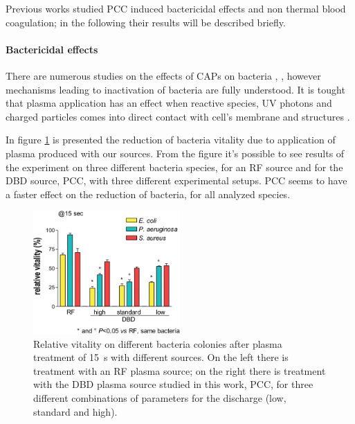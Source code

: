Previous works studied PCC induced bactericidal effects and non thermal blood coagulation; in the following their results will be described briefly.

\paragraph{Bactericidal effects}
There are numerous studies on the effects of CAPs on bacteria \cite{1167632}, \cite{1673530}, however mechanisms leading to inactivation of bacteria are fully understood. It is tought that plasma application has an effect when reactive species, UV photons and charged particles comes into direct contact with cell's membrane and structures \cite{plmed_review}.

In figure \ref{fig:bact} is presented the reduction of bacteria vitality due to application of plasma produced with our sources. From the figure it's possible to see results of the experiment on three different bacteria species, for an RF source and for the DBD source, PCC, with three different experimental setups. PCC seems to have a faster effect on the reduction of bacteria, for all analyzed species. 
\begin{figure}
 \centering
 \includegraphics[width=0.5\textwidth]{Images/Intro/bacteria2.png}
 \caption{Relative vitality on different bacteria colonies after plasma treatment of \SI{15}{\second} with different sources. On the left there is treatment with an RF plasma source; on the right there is treatment with the DBD plasma source studied in this work, PCC, for three different combinations of parameters for the discharge (low, standard and high).}
 \label{fig:bact}
\end{figure}


